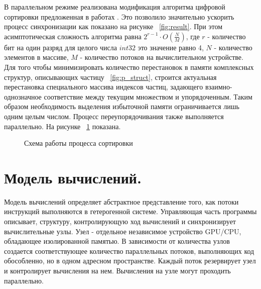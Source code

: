 В параллельном режиме реализована модификация алгоритма цифровой сортировки предложенная в работах \cite{Knuth1998, Marcho1991}. Это позволило значительно ускорить процесс синхронизации как показано на рисунке ~\ref{fig:result}. При этом асимптотическая сложность алгоритма равна \( 2^{r-1} \cdot O(\frac{N}{M}) \), где \( r \) - количество бит на один разряд для целого числа \( int32 \) это значение равно 4, \( N \) - количество элементов в массиве, \( M \) - количество потоков на вычислительном устройстве. Для того чтобы минимизировать количество перестановок в памяти комплексных структур, описывающих частицу ~\ref{fig:p_struct}, строится актуальная перестановка специального массива  индексов частиц, задающего взаимно-однозначное соответствие между текущим множеством и упорядоченным. Таким образом необходимость выделения избыточной памяти ограничивается лишь одним целым числом.
Процесс переупорядочивания также выполняется параллельно. На рисунке ~\ref{fig:sort1} показана.
\begin{figure}[ht]
  \caption{Схема работы процесса сортировки}\label{fig:sort1}
\end{figure}

\section{Модель вычислений.}\label{sec:ch3/sect3}

Модель вычислений определяет абстрактное представление того, как потоки инструкций выполняются в гетерогенной системе. Управляющая часть программы описывает, структуру, контролирующую ход вычислений и синхронизирует вычислительные узлы. Узел - отдельное независимое устройство GPU/CPU, обладающее изолированной памятью. В зависимости от количества узлов создается соответствующее количество параллельных потоков, выполняющих код обособленно, но в одном адресном пространстве. Каждый поток резервирует узел и контролирует вычисления на нем. Вычисления на узле могут проходить параллельно.

